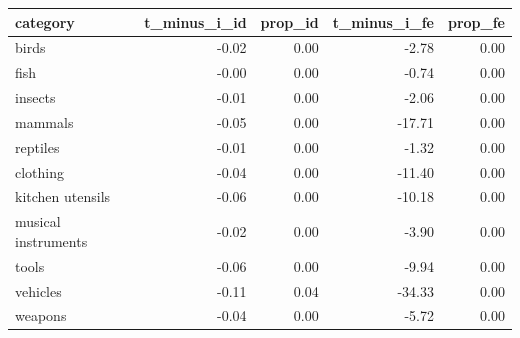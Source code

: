 \begin{table}[ht]
\centering
\begin{tabular}{lrrrr}
  \hline
category & t\_minus\_i\_id & prop\_id & t\_minus\_i\_fe & prop\_fe \\ 
  \hline
birds & -0.02 & 0.00 & -2.78 & 0.00 \\ 
  fish & -0.00 & 0.00 & -0.74 & 0.00 \\ 
  insects & -0.01 & 0.00 & -2.06 & 0.00 \\ 
  mammals & -0.05 & 0.00 & -17.71 & 0.00 \\ 
  reptiles & -0.01 & 0.00 & -1.32 & 0.00 \\ 
  clothing & -0.04 & 0.00 & -11.40 & 0.00 \\ 
  kitchen utensils & -0.06 & 0.00 & -10.18 & 0.00 \\ 
  musical instruments & -0.02 & 0.00 & -3.90 & 0.00 \\ 
  tools & -0.06 & 0.00 & -9.94 & 0.00 \\ 
  vehicles & -0.11 & 0.04 & -34.33 & 0.00 \\ 
  weapons & -0.04 & 0.00 & -5.72 & 0.00 \\ 
   \hline
\end{tabular}
\end{table}
